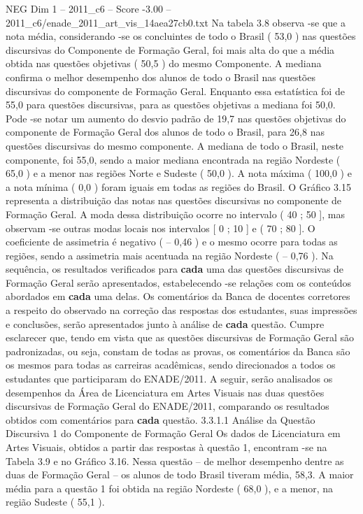 \begin{textsample}{NEG Dim 1 – 2011\_c6 – Score -3.00 – 2011\_c6/enade\_2011\_art\_vis\_14aea27cb0.txt}
Na tabela 3.8 observa -se que a nota média, considerando -se os concluintes de todo o Brasil ( 53,0 ) nas questões discursivas do Componente de Formação Geral, foi mais alta do que a média obtida nas questões objetivas ( 50,5 ) do mesmo Componente.
A mediana confirma o melhor desempenho dos alunos de todo o Brasil nas questões discursivas do componente de Formação Geral.
Enquanto essa estatística foi de 55,0 para questões discursivas, para as questões objetivas a mediana foi 50,0.
Pode -se notar um aumento do desvio padrão de 19,7 nas questões objetivas do componente de Formação Geral dos alunos de todo o Brasil, para 26,8 nas questões discursivas do mesmo componente.
A mediana de todo o Brasil, neste componente, foi 55,0, sendo a maior mediana encontrada na região Nordeste ( 65,0 ) e a menor nas regiões Norte e Sudeste ( 50,0 ).
A nota máxima ( 100,0 ) e a nota mínima ( 0,0 ) foram iguais em todas as regiões do Brasil.
O Gráfico 3.15 representa a distribuição das notas nas questões discursivas no componente de Formação Geral.
A moda dessa distribuição ocorre no intervalo ( 40 ; 50 ], mas observam -se outras modas locais nos intervalos [ 0 ; 10 ] e ( 70 ; 80 ].
O coeficiente de assimetria é negativo ( – 0,46 ) e o mesmo ocorre para todas as regiões, sendo a assimetria mais acentuada na região Nordeste ( – 0,76 ).
Na sequência, os resultados verificados para \textbf{cada} uma das questões discursivas de Formação Geral serão apresentados, estabelecendo -se relações com os conteúdos abordados em \textbf{cada} uma delas.
Os comentários da Banca de docentes corretores a respeito do observado na correção das respostas dos estudantes, suas impressões e conclusões, serão apresentados junto à análise de \textbf{cada} questão.
Cumpre esclarecer que, tendo em vista que as questões discursivas de Formação Geral são padronizadas, ou seja, constam de todas as provas, os comentários da Banca são os mesmos para todas as carreiras acadêmicas, sendo direcionados a todos os estudantes que participaram do ENADE/2011.
A seguir, serão analisados os desempenhos da Área de Licenciatura em Artes Visuais nas duas questões discursivas de Formação Geral do ENADE/2011, comparando os resultados obtidos com comentários para \textbf{cada} questão. 3.3.1.1 Análise da Questão Discursiva 1 do Componente de Formação Geral Os dados de Licenciatura em Artes Visuais, obtidos a partir das respostas à questão 1, encontram -se na Tabela 3.9 e no Gráfico 3.16.
Nessa questão – de melhor desempenho dentre as duas de Formação Geral – os alunos de todo Brasil tiveram média, 58,3.
A maior média para a questão 1 foi obtida na região Nordeste ( 68,0 ), e a menor, na região Sudeste ( 55,1 ).

\end{textsample}
